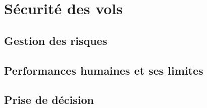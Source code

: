 \section{Sécurité des vols}
	\subsection{Gestion des risques}
	
	\subsection{Performances humaines et ses limites}
	
	\subsection{Prise de décision}